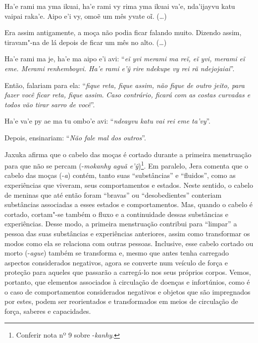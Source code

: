 \begin{paracol}{2}
\smallskip

\switchcolumn
\medskip
\noindent
Ha’e rami ma yma ikuai, ha’e rami vy rima yma ikuai va’e, nda’ijayvu
katu vaipai raka’e.
Aipo e'i vy, omoẽ um mês yvate oĩ. (\ldots{})

\bigskip

\switchcolumn
\noindent
Era assim antigamente, a moça não podia ficar falando muito. Dizendo
assim, tiravam"-na de lá depois de ficar um mês no alto. (\ldots{})

\smallskip

\switchcolumn
\medskip
\noindent
Ha'e rami ma je, ha'e ma aipo e'i avi: ``\emph{eĩ yvi merami ma reĩ, eĩ
yvi, merami eĩ eme. Merami renhemboyvi. Ha'e rami e'ỹ rire ndekupe vy
rei rã ndejojaiai}''. 

\bigskip

\switchcolumn
\noindent
Então, falariam para ela: ``\emph{fique reta, fique assim, não fique de
outro jeito, para fazer você ficar reta, fique assim}. \emph{Caso
contrário, ficará com as costas curvadas e todos vão tirar sarro de
você}''.

\smallskip

\switchcolumn
\medskip
\noindent
Ha'e va'e py ae ma tu ombo'e avi: ``\emph{ndeayvu katu vai rei eme
ta'vy}''.

\bigskip

\switchcolumn
\noindent
Depois, ensinariam: ``\emph{Não fale mal dos outros}''.
\end{paracol}

\bigskip

Jaxuka afirma que o cabelo das moças é cortado durante a primeira
menstruação para que não se percam (-\emph{mokanhy aguã
e’ỹ})\footnote[14]{Conferir nota nº 9 sobre -\emph{kanhy}.}. Em paralelo,
Jera comenta que o cabelo das moças (-\emph{a}) contém, tanto suas
``substâncias'' e ``fluidos'', como as experiências que viveram, seus
comportamentos e estados. Neste sentido, o cabelo de meninas que até
então foram ``bravas'' ou ``desobedientes'' conteriam substâncias
associadas a esses estados e comportamentos. Mas, quando o cabelo é
cortado, cortam"-se também o fluxo e a continuidade dessas substâncias e
experiências. Desse modo, a primeira menstruação contribui para
``limpar'' a pessoa das suas substâncias e experiências anteriores, assim
como transformar os modos como ela se relaciona com outras pessoas.
Inclusive, esse cabelo cortado ou morto (-\emph{ague}) também se transforma e,
mesmo que antes tenha carregado aspectos considerados negativos, agora
se converte num veículo de força e proteção para aqueles que passarão a
carregá-lo nos seus próprios corpos. Vemos, portanto, que elementos
associados à circulação de doenças e infortúnios, como é o caso de
comportamentos considerados negativos e objetos que são impregnados por
estes, podem ser reorientados e transformados em meios de circulação de
força, saberes e capacidades. 

